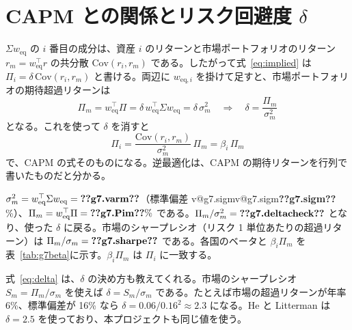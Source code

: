 \documentclass[xelatex,ja=standard,jafont=hiragino-pron,a4paper,11pt,openany]{bxjsreport}
\makeatletter
\newcommand{\V}[1]{\ifcsname v@#1\endcsname\csname v@#1\endcsname\else\textbf{??#1??}\fi}
\newcommand{\tabin}[1]{\adjustbox{max width=\linewidth}{}}
\newcommand{\T}{^{\top}}
\newcommand{\weq}{w_{\mathrm{eq}}}
\newcommand{\tabref}[1]{表~\ref{#1}}
\makeatother
\begin{document}
\begin{table}[htbp]
\centering
\caption{G7 の標準偏差、時価総額の比率、均衡リターン（年率、$\delta = 2.5$）。}
\label{tab:g7inputs}
\small\tabin{g7_inputs}
\end{table}

\section{CAPM との関係とリスク回避度 $\delta$}

$\Sigma\weq$ の $i$ 番目の成分は、資産 $i$ のリターンと市場ポートフォリオのリターン $r_m = \weq\T r$ の共分散 $\mathrm{Cov}(r_i, r_m)$ である。したがって式~\eqref{eq:implied} は $\Pi_i = \delta\,\mathrm{Cov}(r_i, r_m)$ と書ける。両辺に $w_{\mathrm{eq},i}$ を掛けて足すと、市場ポートフォリオの期待超過リターンは
\begin{equation}
\Pi_m = \weq\T\Pi = \delta\,\weq\T\Sigma\weq = \delta\,\sigma_m^2
\quad\Longrightarrow\quad
\delta = \frac{\Pi_m}{\sigma_m^2}
\label{eq:delta}
\end{equation}
となる。これを使って $\delta$ を消すと
\begin{equation}
\Pi_i = \frac{\mathrm{Cov}(r_i, r_m)}{\sigma_m^2}\,\Pi_m = \beta_i\,\Pi_m
\label{eq:capm}
\end{equation}
で、CAPM の式そのものになる。逆最適化は、CAPM の期待リターンを行列で書いたものだと分かる。

\begin{exbox}
$\sigma_m^2 = \weq\T\Sigma\weq = \V{g7.varm}$（標準偏差 \V{g7.sigm}\%）、$\Pi_m = \weq\T\Pi = \V{g7.Pim}\%$ である。$\Pi_m/\sigma_m^2 = \V{g7.deltacheck}$ となり、使った $\delta$ に戻る。市場のシャープレシオ（リスク 1 単位あたりの超過リターン）は $\Pi_m/\sigma_m = \V{g7.sharpe}$ である。各国のベータと $\beta_i\Pi_m$ を\tabref{tab:g7beta}に示す。$\beta_i\Pi_m$ は $\Pi_i$ に一致する。
\end{exbox}

\begin{table}[htbp]
\centering
\caption{G7 のベータと、CAPM の式で計算した期待超過リターン。}
\label{tab:g7beta}
\small\tabin{g7_beta}
\end{table}

式~\eqref{eq:delta} は、$\delta$ の決め方も教えてくれる。市場のシャープレシオ $S_m = \Pi_m/\sigma_m$ を使えば $\delta = S_m/\sigma_m$ である。たとえば市場の超過リターンが年率 6\%、標準偏差が 16\% なら $\delta = 0.06/0.16^2 \approx 2.3$ になる。He と Litterman は $\delta = 2.5$ を使っており、本プロジェクトも同じ値を使う。
\end{document}
